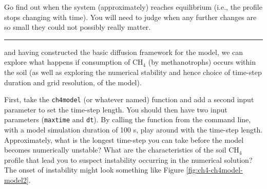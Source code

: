 \documentclass{tufte-book} %
\begin{document}
Go find out when the system (approximately) reaches equilibrium (i.e., the profile stops changing with time). You will need to judge when any further changes are so small they could not possibly really matter.

\noindent\rule[0.0ex]{\linewidth}{0.5pt}

 and having constructed the basic diffusion framework for the model, we can explore what happens if consumption of CH\(_{4}\) (by methanotrophs) occurs within the soil (as well as exploring the numerical stability and hence choice of time-step duration and grid resolution, of the model).

First, take the \texttt{ch4model} (or whatever named) function and add a second input parameter to set the time-step length. You should then have two input parameters (\texttt{maxtime} and \texttt{dt}). By calling the function from the command line, with a model simulation duration of 100 s, play around with the time-step length. Approximately, what is the longest time-step you can take before the model becomes numerically unstable? What are the characteristics of the soil CH\(_{4}\) profile that lead you to suspect instability occurring in the numerical solution? The onset of instability might look something like Figure \ref{fig:ch4-ch4model-model2}.
\end{document}
